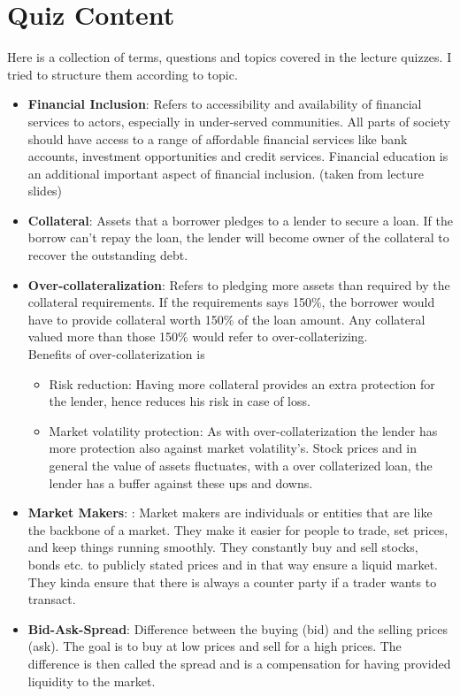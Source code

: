 \documentclass{article}
\begin{document}
\section{Quiz Content}
Here is a collection of terms, questions and topics covered in the lecture quizzes. I tried to structure them according to topic.

\begin{itemize}
    \item \textbf{Financial Inclusion}: Refers to accessibility and availability of financial services to actors, especially in under-served communities. All parts of society should have access to a range of affordable financial services like bank accounts, investment opportunities and credit services. Financial education is an additional important aspect of financial inclusion. 
    (taken from lecture slides)
    \item \textbf{Collateral}:  Assets that a borrower pledges to a lender to secure a loan.
    If the borrow can't repay the loan, the lender will become owner of the collateral to recover the outstanding debt.
    
    \item \textbf{Over-collateralization}: Refers to pledging more assets than required by the collateral requirements. If the requirements says 150\%, the borrower would have to provide collateral worth 150\% of the loan amount. Any collateral valued more than those 150\% would refer to over-collaterizing.\\
    Benefits of over-collaterization is
    \begin{itemize}
     \item {Risk reduction}:
        Having more collateral provides an extra protection for the lender, hence reduces his risk in case of loss.  
    \item {Market volatility protection}:
    As with over-collaterization the lender has more protection also against market volatility's. Stock prices and in general the value of assets fluctuates, with a over collaterized loan, the lender has a buffer against these ups and downs.
     \end{itemize}

     \item \textbf{Market Makers}: :
        Market makers are individuals or entities that are like the backbone of a market. They make it easier for people to trade, set prices, and keep things running smoothly. They constantly buy and sell stocks, bonds etc. to publicly stated prices and in that way ensure a liquid market. They kinda ensure that there is always a counter party if a trader wants to transact.
    \item \textbf{Bid-Ask-Spread}: Difference between the buying (bid) and the selling prices (ask). The goal is to buy at low prices and sell for a high prices. The difference is then called the spread and is a compensation for having provided liquidity to the market.
        

\end{itemize}
\end{document}
